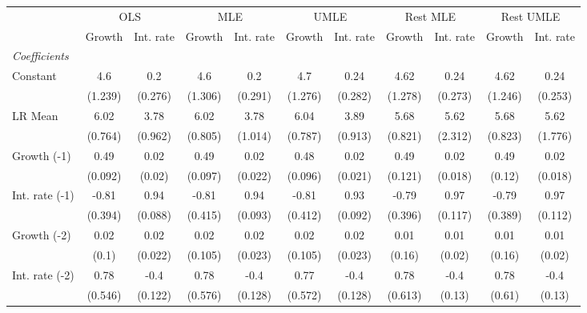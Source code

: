 \begin{table}[htbp] 
	\centering
	\begin{tabular}{@{\extracolsep{4pt}}lcccccccccc@{}}		\hline\hline
		 		 & \multicolumn{2}{c}{OLS} &\multicolumn{2}{c}{MLE} &\multicolumn{2}{c}{UMLE} &\multicolumn{2}{c}{Rest MLE} &\multicolumn{2}{c}{Rest UMLE} \\ 
 		 & Growth 	 & Int. rate 	 & Growth 	 & Int. rate 	 & Growth 	 & Int. rate 	 & Growth 	 & Int. rate 	 & Growth 	 & Int. rate\\\cline{2-3}\cline{4-5}\cline{6-7}\cline{8-9}\cline{10-11}
\rule{0pt}{4ex} 
 \emph{Coefficients} 	  		 & 		 & 		 & 		 & 		 & 		 & 		 & 		 & 		 & 		 &\\ 
\quad Constant 	 & 4.6 	 & 0.2 	 & 4.6 	 & 0.2 	 & 4.7 	 & 0.24 	 & 4.62 	 & 0.24 	 & 4.62 	 & 0.24	 \\ 
 		 & (1.239) 	 & (0.276) 	 & (1.306) 	 & (0.291) 	 & (1.276) 	 & (0.282) 	 & (1.278) 	 & (0.273) 	 & (1.246) 	 & (0.253) 	 \\ 
\quad LR Mean 	 & 6.02 	 & 3.78 	 & 6.02 	 & 3.78 	 & 6.04 	 & 3.89 	 & 5.68 	 & 5.62 	 & 5.68 	 & 5.62	 \\ 
 		 & (0.764) 	 & (0.962) 	 & (0.805) 	 & (1.014) 	 & (0.787) 	 & (0.913) 	 & (0.821) 	 & (2.312) 	 & (0.823) 	 & (1.776) 	 \\ 
\quad Growth (-1) 	 &0.49 	 & 0.02 	 & 0.49 	 & 0.02 	 & 0.48 	 & 0.02 	 & 0.49 	 & 0.02 	 & 0.49 	 & 0.02	 \\ 
 		 & (0.092) 	 & (0.02) 	 & (0.097) 	 & (0.022) 	 & (0.096) 	 & (0.021) 	 & (0.121) 	 & (0.018) 	 & (0.12) 	 & (0.018) 	 \\ 
\quad Int. rate (-1) 	 &-0.81 	 & 0.94 	 & -0.81 	 & 0.94 	 & -0.81 	 & 0.93 	 & -0.79 	 & 0.97 	 & -0.79 	 & 0.97	 \\ 
 		 & (0.394) 	 & (0.088) 	 & (0.415) 	 & (0.093) 	 & (0.412) 	 & (0.092) 	 & (0.396) 	 & (0.117) 	 & (0.389) 	 & (0.112) 	 \\ 
\quad Growth (-2) 	 &0.02 	 & 0.02 	 & 0.02 	 & 0.02 	 & 0.02 	 & 0.02 	 & 0.01 	 & 0.01 	 & 0.01 	 & 0.01	 \\ 
 		 & (0.1) 	 & (0.022) 	 & (0.105) 	 & (0.023) 	 & (0.105) 	 & (0.023) 	 & (0.16) 	 & (0.02) 	 & (0.16) 	 & (0.02) 	 \\ 
\quad Int. rate (-2) 	 &0.78 	 & -0.4 	 & 0.78 	 & -0.4 	 & 0.77 	 & -0.4 	 & 0.78 	 & -0.4 	 & 0.78 	 & -0.4	 \\ 
 		 & (0.546) 	 & (0.122) 	 & (0.576) 	 & (0.128) 	 & (0.572) 	 & (0.128) 	 & (0.613) 	 & (0.13) 	 & (0.61) 	 & (0.13) 	 \\ 

\end{tabular}
\end{table}
